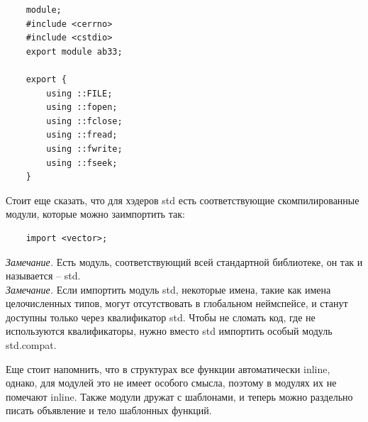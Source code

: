 \documentclass[12pt, a4paper]{article}
\begin{document}
\begin{verbatim}
	module;
	#include <cerrno>
	#include <cstdio>
	export module ab33;
	
	export {
		using ::FILE;
		using ::fopen;
		using ::fclose;
		using ::fread;
		using ::fwrite;
		using ::fseek;
	}
\end{verbatim}
Стоит еще сказать, что для хэдеров std есть соответствующие скомпилированные модули, которые можно заимпортить так:
\begin{verbatim}
	import <vector>;
\end{verbatim}
\textit{Замечание.} Есть модуль, соответствующий всей стандартной библиотеке, он так и называется -- std.\\
\textit{Замечание.} Если импортить модуль std, некоторые имена, такие как имена целочисленных типов, могут отсутствовать в глобальном неймспейсе, и станут доступны только через квалификатор std. Чтобы не сломать код, где не используются квалификаторы, нужно вместо std импортить особый модуль std.compat.\par
Еще стоит напомнить, что в структурах все функции автоматически inline, однако, для модулей это не имеет особого смысла, поэтому в модулях их не помечают inline. Также модули дружат с шаблонами, и теперь можно раздельно писать объявление и тело шаблонных функций. \\
\end{document}
